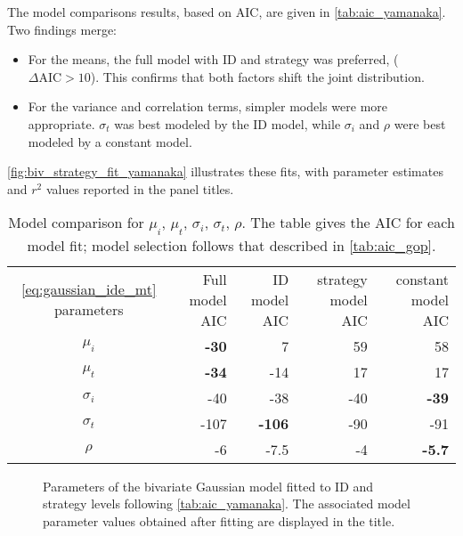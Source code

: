 \documentclass[acmlarge, manuscript,review]{acmart}
\newcommand{\mmt}{\ensuremath{\overline{\mt}}\xspace}
\newcommand{\mt}{\ensuremath{{\text{MT}}}\xspace}
\newcommand{\ide}{\ensuremath{{\text{ID}_e}}\xspace}
\begin{document}
The model comparisons results, based on AIC, are given in \autoref{tab:aic_yamanaka}. Two findings merge:
\begin{itemize}
	\item For the means, the full model with ID and strategy was preferred, ($\Delta\text{AIC} > 10$). This confirms that both factors shift the joint distribution.
	\item For the variance and correlation terms, simpler models were more appropriate. $\sigma_t$ was best modeled by the ID model, while $\sigma_i$ and $\rho$ were best modeled by a constant model.
\end{itemize}

\autoref{fig:biv_strategy_fit_yamanaka} illustrates these fits, with parameter estimates and $r^2$ values reported in the panel titles.



\begin{table}[htbp]
	\centering
	\caption{Model comparison for $\mu_i$, $\mu_t$, $\sigma_i$, $\sigma_t$, $\rho$. The table gives the AIC for each model fit; model selection follows that described in \autoref{tab:aic_gop}.}
	\label{tab:aic_yamanaka}
	\begin{tabular}{c rrrr}
	\autoref{eq:gaussian_ide_mt} parameters	& Full model AIC & ID model AIC& strategy model AIC& constant model AIC\\
	$\mu_i$ & \textbf{-30} & 7 & 59 & 58 \\
	$\mu_t$ & \textbf{-34} & -14  & 17 & 17 \\
	$\sigma_i$ & -40 & -38 & -40 & \textbf{-39} \\
	$\sigma_t$ & -107 & \textbf{-106} & -90 & -91 \\
	$\rho$ & -6 & -7.5& -4& \textbf{-5.7} \\
	\end{tabular}
\end{table}


\begin{figure}[htbp]
	\centering
	\caption{Parameters of the bivariate Gaussian model fitted to ID and strategy levels following \autoref{tab:aic_yamanaka}. The associated model parameter values obtained after fitting are displayed in the title.}
	\label{fig:biv_strategy_fit_yamanaka}
\end{figure}
\end{document}
